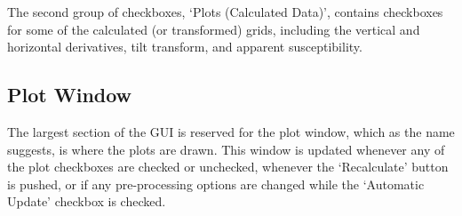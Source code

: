 \documentclass[letterpaper,10pt,english,openany,oneside]{sphinxmanual}
\begin{document}
The second group of checkboxes, ‘Plots (Calculated Data)’, contains checkboxes for some of the calculated (or transformed) grids, including the vertical and horizontal derivatives, tilt transform, and apparent susceptibility.


\subsection{Plot Window}
\label{\detokenize{content/getting_started/GUI_overview:plot-window}}\label{\detokenize{content/getting_started/GUI_overview:id5}}
The largest section of the GUI is reserved for the plot window, which as the name suggests, is where the plots are drawn. This window is updated whenever any of the plot checkboxes are checked or unchecked, whenever the ‘Recalculate’ button is pushed, or if any pre-processing options are changed while the ‘Automatic Update’ checkbox is checked.
\end{document}
